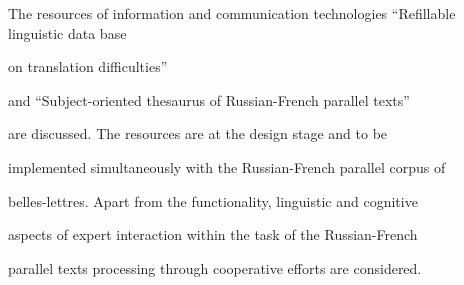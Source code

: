 \titele{\tit}{\aut}{\auf}{\leftkol}{\rightkol}










\noindent


The resources of information and communication technologies ``Refillable linguistic data base 


on translation difficulties'' 


and ``Subject-oriented thesaurus of Russian-French parallel texts'' 


are discussed. The resources are at the design stage and to be 


implemented simultaneously with the Russian-French parallel corpus of 


belles-lettres. Apart from the functionality, linguistic and cognitive 


aspects of expert interaction within the task of the Russian-French 


parallel texts processing through cooperative efforts are considered.
























\def\tit{DATA ACQUISITION SIMULATION FOR NICA EXPERIMENT}





\def\aut{V.\,V.~Korenkov$^1$, A.\,V.~Nechaevskiy$^2$, and~V.\,V.~Trofimov$^3$}





\def\auf{$^1$Joint Institute for Nuclear Research, Laboratory of Information 


Technologies Dubna, korenkov@cv.jinr.ru\\[1pt]


$^2$Joint Institute for Nuclear Research, Laboratory of Information Technologies Dubna,\\


$\hphantom{^1}$Andrey.Nechaevskiy@gmail.com\\[1pt]


$^3$Joint Institute for Nuclear Research, Laboratory of Information Technologies Dubna, 


trofimov@jinr.ru}








